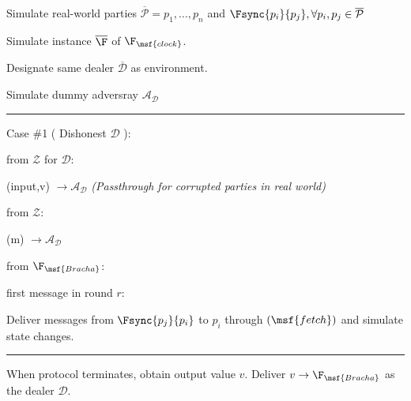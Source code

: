 \begin{bbox}[title={Simulator $S_{\msf{Bracha}}$}]

Simulate real-world parties $\overline{\mathcal{P}} = p_1,...,p_n$ and $\Fsync{p_i}{p_j}, \forall p_i,p_j \in \overline{\mathcal{P}}$

Simulate instance $\overline{\F}$ of $\F_{\msf{clock}}$.

Designate same dealer $\overline{\mathcal{D}}$ as environment.

Simulate dummy adversray $\mathcal{A}_{\mathcal{D}}$

\vspace{2mm} \hrule \vspace{2mm}

Case \#1 ( Dishonest $\mathcal{D}$ ):

\OnInput {} from $\mathcal{Z}$ for $\mathcal{D}$:

	\quad \Send (input,v) $\rightarrow \mathcal{A}_{\mathcal{D}}$ {\em (Passthrough for corrupted parties in real world)}

\OnInput {} from $\mathcal{Z}$:

	\quad \Send (m) $\rightarrow \mathcal{A}_{\mathcal{D}}$

\OnInput {} from $\F_{\msf{Bracha}}$:

	\quad \If first message in round $r$:

		\quad \quad Deliver messages from $\Fsync{p_j}{p_i}$ to $p_i$ through $(\msf{fetch})$ and simulate state changes.

\vspace{2mm} \hrule \vspace{2mm}

When protocol terminates, obtain output value $v$. Deliver $v \rightarrow \F_{\msf{Bracha}}$ as the dealer $\mathcal{D}$.

\end{bbox}
